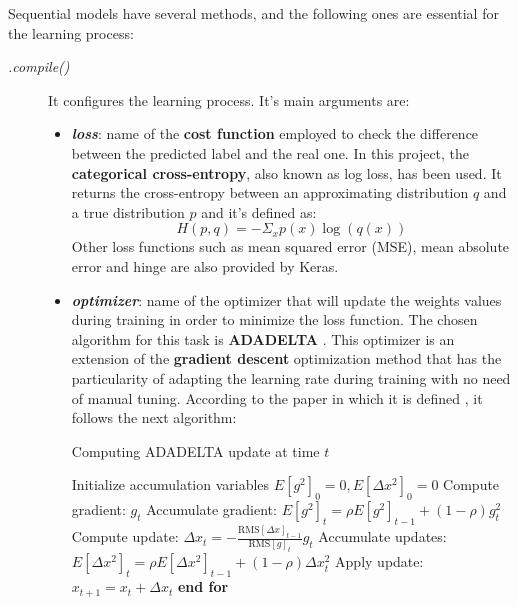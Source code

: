 Sequential models have several methods, and the following ones are essential for the learning process:
\begin{description}
	\item[\textit{.compile()}] It configures the learning process. It's main arguments are:
	\begin{itemize}
		\item \textbf{\textit{loss}}: name of the \textbf{cost function} employed to check the difference between the predicted label and the real one. In this project, the \textbf{categorical cross-entropy}, also known as log loss, has been used. It returns the cross-entropy between an approximating distribution $q$ and a true distribution $p$ \cite{2016arXiv160502688short} and it's defined as:
		\begin{equation}\label{eq:categorical_crossentropy}
		H(p,q)=-\Sigma_{x}p(x)\log(q(x))
		\end{equation}		
		Other loss functions such as mean squared error (MSE), mean absolute error and hinge are also provided by Keras.
		
		\item \textbf{\textit{optimizer}}: name of the optimizer that will update the weights values during training in order to minimize the loss function. The chosen algorithm for this task is \textbf{ADADELTA} \cite{DBLP:journals/corr/abs-1212-5701}. This optimizer is an extension of the \textbf{gradient descent} optimization method that has the particularity of adapting the learning rate during training with no need of manual tuning. According to the paper in which it is defined \cite{DBLP:journals/corr/abs-1212-5701}, it follows the next algorithm:		
		\begin{minipage}{\linewidth}
		\begin{algorithm}[H]
			\caption{Computing ADADELTA update at time $t$}\label{adadelta}
		  	\begin{algorithmic}[1]
		  		\State Initialize accumulation variables $E[g^2]_0=0, E[\Delta x^2]_0 = 0$
		  		 
		  		\State Compute gradient: $g_t$
		  		\State Accumulate gradient: $E[g^2]_t=\rho E[g^2]_{t-1}+(1-\rho)g_t^2$
		  		\State Compute update: $\Delta x_t=-\frac{\mathrm{RMS}[\Delta x]_{t-1}}{\mathrm{RMS}[g]_t}g_t$
		  		\State Accumulate updates: $E[\Delta x^2]_t=\rho E[\Delta x^2]_{t-1}+(1-\rho)\Delta x_t^2$
		  		\State Apply update: $x_{t+1}=x_t+\Delta x_t$
				\EndFor
		  		\State \textbf{end for}
		  	\end{algorithmic}
		\end{algorithm}
		\end{minipage}\\
				

\end{itemize}
\end{description}
